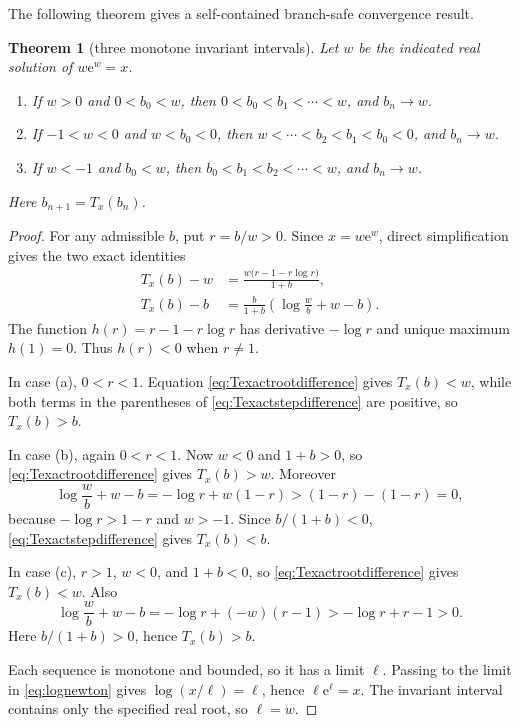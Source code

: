 \documentclass[11pt,oneside]{book}
\newtheorem{theorem}{Theorem}[chapter]
\theoremstyle{definition}
\theoremstyle{remark}
\newcommand{\ee}{\mathrm e}
\begin{document}
The following theorem gives a self-contained branch-safe convergence result.

\begin{theorem}[three monotone invariant intervals]
\label{thm:lognewtonmonotone}
Let $w$ be the indicated real solution of $w\ee^w=x$.
\begin{enumerate}[label=(\alph*)]
\item If $w>0$ and $0<b_0<w$, then
$0<b_0<b_1<\cdots<w$, and $b_n\to w$.
\item If $-1<w<0$ and $w<b_0<0$, then
$w<\cdots<b_2<b_1<b_0<0$, and $b_n\to w$.
\item If $w<-1$ and $b_0<w$, then
$b_0<b_1<b_2<\cdots<w$, and $b_n\to w$.
\end{enumerate}
Here $b_{n+1}=T_x(b_n)$.
\end{theorem}

\begin{proof}
For any admissible $b$, put $r=b/w>0$.  Since
$x=w\ee^w$, direct simplification gives the two exact identities
\begin{align}
 T_x(b)-w
 &=\frac{w\bigl(r-1-r\log r\bigr)}{1+b},
 \label{eq:Texactrootdifference}\\
 T_x(b)-b
 &=\frac{b}{1+b}\left(\log\frac wb+w-b\right).
 \label{eq:Texactstepdifference}
\end{align}
The function $h(r)=r-1-r\log r$ has derivative $-\log r$ and unique maximum
$h(1)=0$.  Thus $h(r)<0$ when $r\ne1$.

In case (a), $0<r<1$.  Equation
\eqref{eq:Texactrootdifference} gives $T_x(b)<w$, while both terms in the
parentheses of \eqref{eq:Texactstepdifference} are positive, so $T_x(b)>b$.

In case (b), again $0<r<1$.  Now $w<0$ and $1+b>0$, so
\eqref{eq:Texactrootdifference} gives $T_x(b)>w$.  Moreover
\[
 \log\frac wb+w-b=-\log r+w(1-r)> (1-r)-(1-r)=0,
\]
because $-\log r>1-r$ and $w>-1$.  Since $b/(1+b)<0$,
\eqref{eq:Texactstepdifference} gives $T_x(b)<b$.

In case (c), $r>1$, $w<0$, and $1+b<0$, so
\eqref{eq:Texactrootdifference} gives $T_x(b)<w$.  Also
\[
 \log\frac wb+w-b=-\log r+(-w)(r-1)>-\log r+r-1>0.
\]
Here $b/(1+b)>0$, hence $T_x(b)>b$.

Each sequence is monotone and bounded, so it has a limit $\ell$.  Passing to
the limit in \eqref{eq:lognewton} gives
$\log(x/\ell)=\ell$, hence $\ell\ee^\ell=x$.  The invariant interval contains
only the specified real root, so $\ell=w$.
\end{proof}
\end{document}
